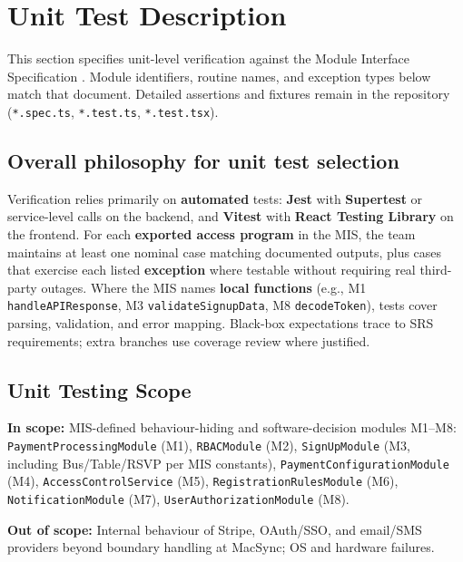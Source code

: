 \documentclass[12pt, titlepage]{article}
\begin{document}
\section{Unit Test Description}

This section specifies unit-level verification against the Module Interface Specification \citet{SL-MIS}. Module identifiers, routine names, and exception types below match that document. Detailed assertions and fixtures remain in the repository (\texttt{*.spec.ts}, \texttt{*.test.ts}, \texttt{*.test.tsx}).

\subsection{Overall philosophy for unit test selection}

Verification relies primarily on \textbf{automated} tests: \textbf{Jest} with \textbf{Supertest} or service-level calls on the backend, and \textbf{Vitest} with \textbf{React Testing Library} on the frontend. For each \textbf{exported access program} in the MIS, the team maintains at least one nominal case matching documented outputs, plus cases that exercise each listed \textbf{exception} where testable without requiring real third-party outages. Where the MIS names \textbf{local functions} (e.g., M1 \texttt{handleAPIResponse}, M3 \texttt{validateSignupData}, M8 \texttt{decodeToken}), tests cover parsing, validation, and error mapping. Black-box expectations trace to SRS requirements; extra branches use coverage review where justified.

\subsection{Unit Testing Scope}

\textbf{In scope:} MIS-defined behaviour-hiding and software-decision modules M1--M8: \texttt{PaymentProcessingModule} (M1), \texttt{RBACModule} (M2), \texttt{SignUpModule} (M3, including Bus/Table/RSVP per MIS constants), \texttt{PaymentConfigurationModule} (M4), \texttt{AccessControlService} (M5), \texttt{RegistrationRulesModule} (M6), \texttt{NotificationModule} (M7), \texttt{UserAuthorizationModule} (M8).

\textbf{Out of scope:} Internal behaviour of Stripe, OAuth/SSO, and email/SMS providers beyond boundary handling at MacSync; OS and hardware failures.
\end{document}
